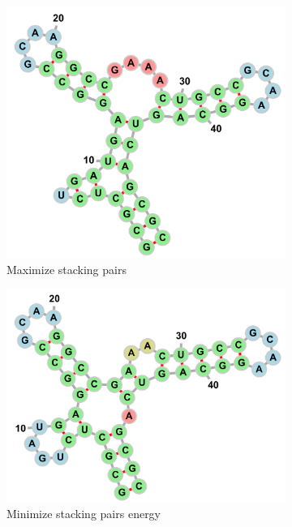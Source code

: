 \documentclass[10pt]{article}
\begin{document}
\begin{figure}[p]
\begin{subfigure}[b]{0.4\linewidth}
        \includegraphics[width=\linewidth]{./img/hammerhead_ribozyme_maxstacks.png}
        \caption{Maximize stacking pairs}
    \end{subfigure}
    \begin{subfigure}[b]{0.4\linewidth}
        \includegraphics[width=\linewidth]{./img/hammerhead_ribozyme_minstackenergy.png}
        \caption{Minimize stacking pairs energy}
    \end{subfigure}
    \begin{center}
        \begin{subfigure}[b]{0.5\linewidth}

\end{subfigure}
\end{center}
\end{figure}
\end{document}
